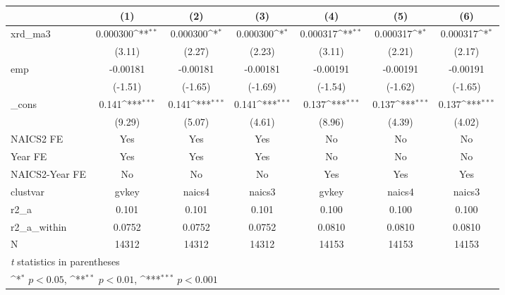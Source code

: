 {
\def\sym#1{\ifmmode^{#1}\else\(^{#1}\)\fi}
\begin{tabular}{l*{6}{c}}
\hline\hline
            &\multicolumn{1}{c}{(1)}         &\multicolumn{1}{c}{(2)}         &\multicolumn{1}{c}{(3)}         &\multicolumn{1}{c}{(4)}         &\multicolumn{1}{c}{(5)}         &\multicolumn{1}{c}{(6)}         \\
\hline
xrd\_ma3     &    0.000300\sym{**} &    0.000300\sym{*}  &    0.000300\sym{*}  &    0.000317\sym{**} &    0.000317\sym{*}  &    0.000317\sym{*}  \\
            &      (3.11)         &      (2.27)         &      (2.23)         &      (3.11)         &      (2.21)         &      (2.17)         \\
[1em]
emp         &    -0.00181         &    -0.00181         &    -0.00181         &    -0.00191         &    -0.00191         &    -0.00191         \\
            &     (-1.51)         &     (-1.65)         &     (-1.69)         &     (-1.54)         &     (-1.62)         &     (-1.65)         \\
[1em]
\_cons      &       0.141\sym{***}&       0.141\sym{***}&       0.141\sym{***}&       0.137\sym{***}&       0.137\sym{***}&       0.137\sym{***}\\
            &      (9.29)         &      (5.07)         &      (4.61)         &      (8.96)         &      (4.39)         &      (4.02)         \\
[1em]
NAICS2 FE   &         Yes         &         Yes         &         Yes         &          No         &          No         &          No         \\
[1em]
Year FE     &         Yes         &         Yes         &         Yes         &          No         &          No         &          No         \\
[1em]
NAICS2-Year FE&          No         &          No         &          No         &         Yes         &         Yes         &         Yes         \\
\hline
clustvar    &       gvkey         &      naics4         &      naics3         &       gvkey         &      naics4         &      naics3         \\
r2\_a        &       0.101         &       0.101         &       0.101         &       0.100         &       0.100         &       0.100         \\
r2\_a\_within &      0.0752         &      0.0752         &      0.0752         &      0.0810         &      0.0810         &      0.0810         \\
N           &       14312         &       14312         &       14312         &       14153         &       14153         &       14153         \\
\hline\hline
\multicolumn{7}{l}{\footnotesize \textit{t} statistics in parentheses}\\
\multicolumn{7}{l}{\footnotesize \sym{*} \(p<0.05\), \sym{**} \(p<0.01\), \sym{***} \(p<0.001\)}\\
\end{tabular}
}
